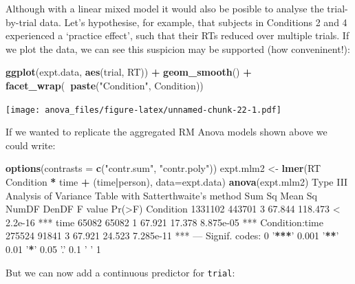 \documentclass[]{article}
\newenvironment{Shaded}{\begin{snugshade}}{\end{snugshade}}
\newcommand{\DataTypeTok}[1]{\textcolor[rgb]{0.13,0.29,0.53}{#1}}
\newcommand{\ErrorTok}[1]{\textcolor[rgb]{0.64,0.00,0.00}{\textbf{#1}}}
\newcommand{\KeywordTok}[1]{\textcolor[rgb]{0.13,0.29,0.53}{\textbf{#1}}}
\newcommand{\NormalTok}[1]{#1}
\newcommand{\OperatorTok}[1]{\textcolor[rgb]{0.81,0.36,0.00}{\textbf{#1}}}
\newcommand{\StringTok}[1]{\textcolor[rgb]{0.31,0.60,0.02}{#1}}
\begin{document}
Although with a linear mixed model it would also be posible to analyse the
trial-by-trial data. Let's hypothesise, for example, that subjects in Conditions
2 and 4 experienced a `practice effect', such that their RTs reduced over
multiple trials. If we plot the data, we can see this suspicion may be supported
(how conveninent!):

\begin{Shaded}
\begin{Highlighting}[]
\KeywordTok{ggplot}\NormalTok{(expt.data,}
  \KeywordTok{aes}\NormalTok{(trial, RT)) }\OperatorTok{+}
\StringTok{  }\KeywordTok{geom_smooth}\NormalTok{() }\OperatorTok{+}
\StringTok{  }\KeywordTok{facet_wrap}\NormalTok{(}\OperatorTok{~}\KeywordTok{paste}\NormalTok{(}\StringTok{"Condition"}\NormalTok{, Condition))}
\end{Highlighting}
\end{Shaded}

\texttt{[image: anova\_files/figure-latex/unnamed-chunk-22-1.pdf]}

If we wanted to replicate the aggregated RM Anova models shown above we could
write:

\begin{Shaded}
\begin{Highlighting}[]
\KeywordTok{options}\NormalTok{(}\DataTypeTok{contrasts =} \KeywordTok{c}\NormalTok{(}\StringTok{"contr.sum"}\NormalTok{, }\StringTok{"contr.poly"}\NormalTok{))}
\NormalTok{expt.mlm2 <-}\StringTok{ }\KeywordTok{lmer}\NormalTok{(RT }\OperatorTok{~}\StringTok{ }\NormalTok{Condition }\OperatorTok{*}\StringTok{ }\NormalTok{time }\OperatorTok{+}\StringTok{ }\NormalTok{(time}\OperatorTok{|}\NormalTok{person), }\DataTypeTok{data=}\NormalTok{expt.data)}
\KeywordTok{anova}\NormalTok{(expt.mlm2)}
\NormalTok{Type III Analysis of Variance Table with Satterthwaite}\StringTok{'s method}
\StringTok{                Sum Sq Mean Sq NumDF  DenDF F value    Pr(>F)    }
\StringTok{Condition      1331102  443701     3 67.844 118.473 < 2.2e-16 ***}
\StringTok{time             65082   65082     1 67.921  17.378 8.875e-05 ***}
\StringTok{Condition:time  275524   91841     3 67.921  24.523 7.285e-11 ***}
\StringTok{---}
\StringTok{Signif. codes:  0 '}\OperatorTok{**}\ErrorTok{*}\StringTok{' 0.001 '}\OperatorTok{**}\StringTok{' 0.01 '}\OperatorTok{*}\StringTok{' 0.05 '}\NormalTok{.}\StringTok{' 0.1 '} \StringTok{' 1}
\end{Highlighting}
\end{Shaded}

But we can now add a continuous predictor for \texttt{trial}:
\end{document}
